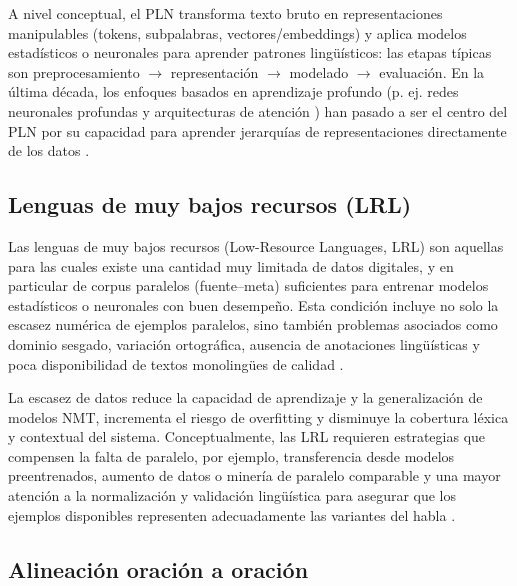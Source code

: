 \documentclass[12pt,a4paper,oneside]{book}
\begin{document}
A nivel conceptual, el PLN transforma texto bruto en representaciones manipulables (tokens, subpalabras, vectores/embeddings) y aplica modelos estadísticos o neuronales para aprender patrones lingüísticos: las etapas típicas son preprocesamiento $\rightarrow$ representación $\rightarrow$ modelado $\rightarrow$ evaluación. En la última década, los enfoques basados en aprendizaje profundo (p. ej. redes neuronales profundas y arquitecturas de atención \cite{bahdanau2015}) han pasado a ser el centro del PLN por su capacidad para aprender jerarquías de representaciones directamente de los datos \parencite{socher2013}.

\subsection{Lenguas de muy bajos recursos (LRL)}\label{lenguas-de-bajo-recursos-lrl}

Las {lenguas de muy bajos recursos} (Low-Resource Languages, LRL) son aquellas para las cuales existe una cantidad muy limitada de datos digitales, y en particular de corpus paralelos (fuente--meta) suficientes para entrenar modelos estadísticos o neuronales con buen desempeño. Esta condición incluye no solo la escasez numérica de ejemplos paralelos, sino también problemas asociados como dominio sesgado, variación ortográfica, ausencia de anotaciones lingüísticas y poca disponibilidad de textos monolingües de calidad \parencite{zoph2016,koehn2017}.

La escasez de datos reduce la capacidad de aprendizaje y la generalización de modelos NMT, incrementa el riesgo de {overfitting} y disminuye la cobertura léxica y contextual del sistema. Conceptualmente, las LRL requieren estrategias que compensen la falta de paralelo, por ejemplo, transferencia desde modelos preentrenados, aumento de datos o minería de paralelo comparable y una mayor atención a la normalización y validación lingüística para asegurar que los ejemplos disponibles representen adecuadamente las variantes del habla \parencite{artetxe2019}.

\subsection{Alineación oración a oración}\label{alineaciuxf3n-oraciuxf3n-a-oraciuxf3n}
\end{document}
